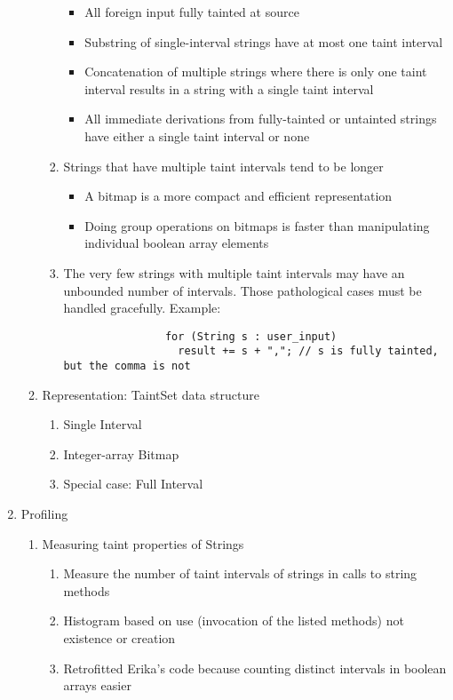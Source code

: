 \documentclass[times,11pt]{article}
\begin{document}
\begin{enumerate}
\begin{enumerate}
\begin{enumerate}
\begin{itemize}
				\item All foreign input fully tainted at source
				\item Substring of single-interval strings have at most one taint interval
				\item Concatenation of multiple strings where there is only one taint interval results in a string with a single taint interval
				\item All immediate derivations from fully-tainted or untainted strings have either a single taint interval or none
				\end{itemize}
			\item Strings that have multiple taint intervals tend to be longer
				\begin{itemize}
				\item A bitmap is a more compact and efficient representation
				\item Doing group operations on bitmaps is faster than manipulating individual boolean array elements
				\end{itemize}
			\item The very few strings with multiple taint intervals may have an unbounded number of intervals. Those pathological cases must be handled gracefully. Example:
				\begin{verbatim}
				for (String s : user_input)
				  result += s + ","; // s is fully tainted, but the comma is not
				\end{verbatim}
			\end{enumerate}
		\item Representation: TaintSet data structure
			\begin{enumerate}
			\item Single Interval
			\item Integer-array Bitmap
			\item Special case: Full Interval
			\end{enumerate}
		\end{enumerate}
	\item Profiling
		\begin{enumerate}
		\item Measuring taint properties of Strings
			\begin{enumerate}
			\item Measure the number of taint intervals of strings in calls to string methods
			\item Histogram based on use (invocation of the listed methods) not existence or creation
			\item Retrofitted Erika's code because counting distinct intervals in boolean arrays easier

\end{enumerate}
\end{enumerate}
\end{enumerate}
\end{document}
